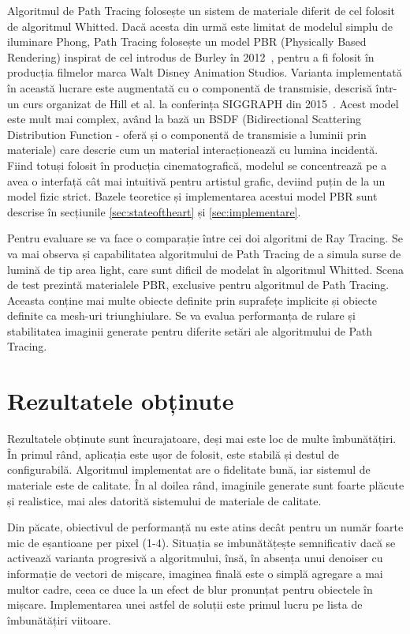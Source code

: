 \documentclass[12pt,a4paper]{report}
\numberwithin{equation}{section} %
\begin{document}
Algoritmul de Path Tracing folosește un sistem de materiale diferit de cel folosit
de algoritmul Whitted. Dacă acesta din urmă este limitat de modelul simplu de iluminare
Phong, Path Tracing folosește un model PBR (Physically Based Rendering) inspirat de
cel introdus de Burley în 2012~\cite{Disney}, pentru a fi folosit în producția filmelor
marca Walt Disney Animation Studios. Varianta implementată în această lucrare este
augmentată cu o componentă de transmisie, descrisă într-un curs organizat de Hill et al. la conferința SIGGRAPH din 2015~\cite{DisneyBSDF}.
Acest model este mult mai complex,
având la bază un BSDF (Bidirectional Scattering Distribution Function - oferă și
o componentă de transmisie a luminii prin materiale) care descrie cum un material
interacționează cu lumina incidentă. Fiind totuși folosit în producția cinematografică,
modelul se concentrează pe a avea o interfață cât mai intuitivă pentru artistul
grafic, deviind puțin de la un model fizic strict. Bazele teoretice și implementarea acestui model
PBR sunt descrise în secțiunile \ref{sec:stateoftheart} și \ref{sec:implementare}.

Pentru evaluare se va
face o comparație între cei doi algoritmi de Ray Tracing. Se va mai observa și
capabilitatea algoritmului de Path Tracing de a simula surse de lumină de tip
area light, care sunt dificil de modelat în algoritmul Whitted.
Scena de test prezintă materialele PBR, exclusive pentru algoritmul de Path Tracing.
Aceasta conține mai multe obiecte definite prin suprafețe implicite și obiecte
definite ca mesh-uri triunghiulare. Se va evalua performanța de rulare și
stabilitatea imaginii generate pentru diferite setări ale algoritmului de Path Tracing.

\section{Rezultatele obținute}

Rezultatele obținute sunt încurajatoare, deși mai este loc de multe îmbunătățiri.
În primul rând, aplicația este ușor de folosit, este stabilă și destul de configurabilă.
Algoritmul implementat are o fidelitate bună, iar sistemul de materiale este de calitate.
În al doilea rând, imaginile generate sunt foarte plăcute și realistice, mai ales
datorită sistemului de materiale de calitate.

Din păcate, obiectivul de performanță nu este atins decât pentru un număr foarte
mic de eșantioane per pixel (1-4). Situația se imbunătățește semnificativ dacă
se activează varianta progresivă a algoritmului, însă, în absența unui denoiser
cu informație de vectori de mișcare, imaginea finală este o simplă agregare a
mai multor cadre, ceea ce duce la un efect de blur pronunțat pentru obiectele în mișcare.
Implementarea unei astfel de soluții este primul lucru pe lista de îmbunătățiri
viitoare.
\end{document}
